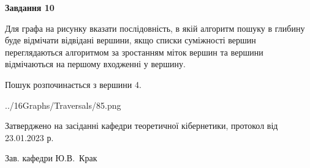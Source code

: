 \documentclass[12pt, ukrainian]{article}
\begin{document}
{\begin {large}
{\begin {center}\textbf{Завдання 10}\end {center}}\par
Для графа на рисунку вказати послідовність, в якій алгоритм пошуку в глибину буде відмічати відвідані вершини, якщо списки суміжності вершин переглядаються алгоритмом за зростанням міток вершин та вершини відмічаються на першому вход\-женні у вершину.\par
Пошук розпочинається з вершини 4.\par

\begin{center}
	{../16Graphs/Traversals/85.png}
\end{center}\par
\newpage


\end {large}
}
{\smallskip \begin {small} Затверджено на засіданні кафедри теоретичної кібернетики, протокол  від   23.01.2023 р.\par\smallskip\smallskip
{\parbox {6.5 cm}{Зав. кафедри \dotfill Ю.В.~Крак}} \end{small}}
\end{document}
